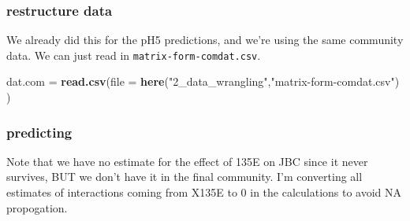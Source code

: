 \documentclass[
]{article}
\newenvironment{Shaded}{\begin{snugshade}}{\end{snugshade}}
\newcommand{\AttributeTok}[1]{\textcolor[rgb]{0.13,0.29,0.53}{#1}}
\newcommand{\FunctionTok}[1]{\textcolor[rgb]{0.13,0.29,0.53}{\textbf{#1}}}
\newcommand{\NormalTok}[1]{#1}
\newcommand{\OtherTok}[1]{\textcolor[rgb]{0.56,0.35,0.01}{#1}}
\newcommand{\StringTok}[1]{\textcolor[rgb]{0.31,0.60,0.02}{#1}}
\begin{document}
\hypertarget{restructure-data-1}{%
\subsubsection{restructure data}\label{restructure-data-1}}

We already did this for the pH5 predictions, and we're using the same
community data. We can just read in \texttt{matrix-form-comdat.csv}.

\begin{Shaded}
\begin{Highlighting}[]
\NormalTok{dat.com }\OtherTok{=} \FunctionTok{read.csv}\NormalTok{(}\AttributeTok{file =} \FunctionTok{here}\NormalTok{(}\StringTok{"2\_data\_wrangling"}\NormalTok{,}\StringTok{"matrix{-}form{-}comdat.csv"}\NormalTok{)}
\NormalTok{)}
\end{Highlighting}
\end{Shaded}

\hypertarget{predicting-1}{%
\subsubsection{predicting}\label{predicting-1}}

Note that we have no estimate for the effect of 135E on JBC since it
never survives, BUT we don't have it in the final community. I'm
converting all estimates of interactions coming from X135E to 0 in the
calculations to avoid NA propogation.
\end{document}
